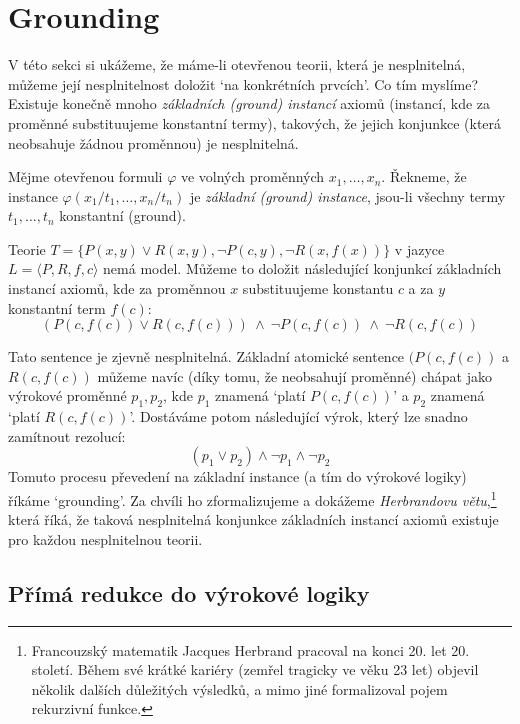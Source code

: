 \section{Grounding}\label{section:grounding}

V této sekci si ukážeme, že máme-li otevřenou teorii, která je nesplnitelná, můžeme její nesplnitelnost doložit `na konkrétních prvcích'. Co tím myslíme? Existuje konečně mnoho \emph{základních (ground) instancí} axiomů (instancí, kde za proměnné substituujeme konstantní termy), takových, že jejich konjunkce (která neobsahuje žádnou proměnnou) je nesplnitelná. 

\begin{definition}
    Mějme otevřenou formuli $\varphi$ ve volných proměnných $x_1,\dots,x_n$. Řekneme, že instance $\varphi(x_1/t_1,\dots,x_n/t_n)$ je \emph{základní (ground) instance}, jsou-li všechny termy $t_1,\dots,t_n$ konstantní (ground).
\end{definition}

\begin{example}
    Teorie $T=\{P(x,y)\lor R(x,y),\neg P(c,y),\neg R(x,f(x))\}$ v jazyce $L=\langle P,R,f,c \rangle$ nemá model. Můžeme to doložit následující konjunkcí základních instancí axiomů, kde za proměnnou $x$ substituujeme konstantu $c$ a za $y$ konstantní term $f(c)$:
$$
(P(c,f(c))\lor R(c,f(c)))\ \land\ \neg P(c,f(c))\ \land\ \neg R(c,f(c))
$$
\end{example}
Tato sentence je zjevně nesplnitelná. Základní atomické sentence $(P(c,f(c))$ a $R(c,f(c))$ můžeme navíc (díky tomu, že neobsahují proměnné) chápat jako výrokové proměnné $p_1,p_2$, kde $p_1$ znamená `platí $P(c,f(c))$' a $p_2$ znamená `platí $R(c,f(c))$'. Dostáváme potom následující výrok, který lze snadno zamítnout rezolucí:
$$
(p_1 \lor p_2) \land \neg p_1 \land \neg p_2
$$
Tomuto procesu převedení na základní instance (a tím do výrokové logiky) říkáme `grounding'. Za chvíli ho zformalizujeme a dokážeme \emph{Herbrandovu větu},\footnote{Francouzský matematik Jacques Herbrand pracoval na konci 20. let 20. století. Během své krátké kariéry (zemřel tragicky ve věku 23 let) objevil několik dalších důležitých výsledků, a mimo jiné formalizoval pojem rekurzivní funkce.} která říká, že taková nesplnitelná konjunkce základních instancí axiomů existuje pro každou nesplnitelnou teorii.

\subsection{Přímá redukce do výrokové logiky}


